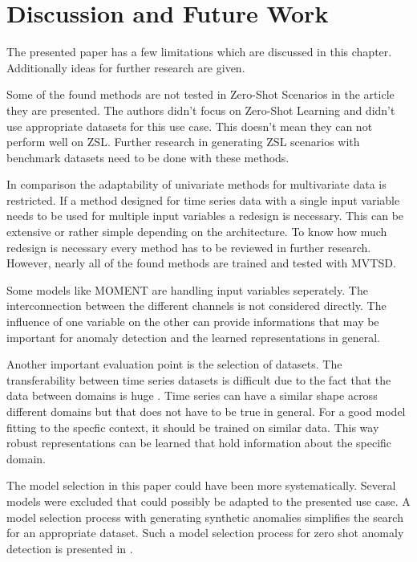 \section{Discussion and Future Work}\label{discussion}
The presented paper has a few limitations which are discussed in this chapter. Additionally ideas for further research are given.

Some of the found methods are not tested in Zero-Shot Scenarios in the article they are presented. The authors didn't focus on Zero-Shot Learning and didn't use appropriate datasets for this use case.  This doesn't mean they can not perform well on ZSL. Further research in generating ZSL scenarios with benchmark datasets need to be done with these methods.

In comparison the adaptability of univariate methods for multivariate data is restricted. If a method designed for time series data with a single input variable needs to be used for multiple input variables a redesign is necessary. This can be extensive or rather simple depending on the architecture. To know how much redesign is necessary every method has to be reviewed in further research. However, nearly all of the found methods are trained and tested with MVTSD.

Some models like MOMENT are handling input variables seperately. The interconnection between the different channels is not considered directly. The influence of one variable on the other can provide informations that may be important for anomaly detection and the learned representations in general.

Another important evaluation point is the selection of datasets. The transferability between time series datasets is difficult due to the fact that the data between domains is huge \cite{ma_survey_2023}. Time series can have a similar shape across different domains but that does not have to be true in general. For a good model fitting to the specfic context, it should be trained on similar data. This way robust representations can be learned that hold information about the specific domain.


The model selection in this paper could have been more systematically. Several models were excluded that could possibly be adapted to the presented use case. A model selection process with generating synthetic anomalies simplifies the search for an appropriate dataset. Such a model selection process for zero shot anomaly detection is presented in \cite{fung_model_2024}.

